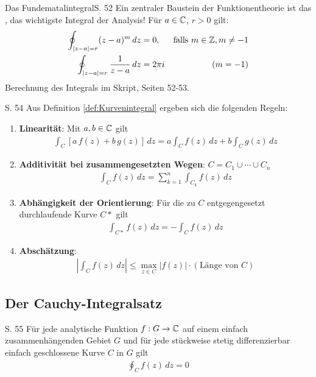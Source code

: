 \begin{bemerkung}{Das Fundematalintegral}{S. 52}
  Ein zentraler Baustein der Funktionentheorie ist das , das wichtigste Integral der Analysis!
  Für $a \in \mathbb{C}$, $r > 0$ gilt:
  \begin{align}
    \oint_{|z-a|=r} (z-a)^m \, dz &= 0, &\text{falls } m \in \mathbb{Z}, m \neq -1 \\
    \oint_{|z-a|=r} \frac{1}{z-a} \, dz &= 2 \pi i & (m = -1)
  \end{align}
  Berechnung des Integrals im Skript, Seiten 52-53.
\end{bemerkung}

\begin{satz}{S. 54}
  Aus Definition \ref{def:Kurvenintegral} ergeben sich die folgenden Regeln:
  \begin{enumerate}[label=\alph*)]
    \item \textbf{Linearität}: Mit $a, b \in \mathbb{C}$ gilt
      \begin{align}
        \int_C \left[ a \, f(z) + b \, g(z) \right] \, dz = a \int_C f(z) \, dz + b \int_C g(z) \, dz
      \end{align}
    \item \textbf{Additivität bei zusammengesetzten Wegen}: $C = C_1 \cup \cdots \cup C_n$
      \begin{align}
        \int_C f(z) \, dz = \sum_{k=1}^n \int_{C_k} f(z) \, dz
      \end{align}
    \item \textbf{Abhängigkeit der Orientierung}: Für die zu $C$ entgegengesetzt durchlaufende Kurve $C*$ gilt
      \begin{align}
        \int_{C*} f(z) \, dz = - \int_{C} f(z) \, dz
      \end{align}
    \item \textbf{Abschätzung}:
      \begin{align}
        \left| \int_{C} f(z) \, dz \right| \leq \max_{z \in C} \left| f(z) \right| \cdot (\text{Länge von } C)
      \end{align}
  \end{enumerate}
\end{satz}



\subsection{Der Cauchy-Integralsatz}

\begin{satz}{S. 55}
  \label{satz:cauchy_integralsatz}
  Für jede analytische Funktion $f: G \to \mathbb{C}$ auf einem einfach zusammenhängenden Gebiet $G$ und für jede stückweise stetig differenzierbar einfach geschlossene Kurve $C$ in $G$ gilt
  \begin{align}
    \oint_C f(z) \, dz = 0
  \end{align}
\end{satz}

